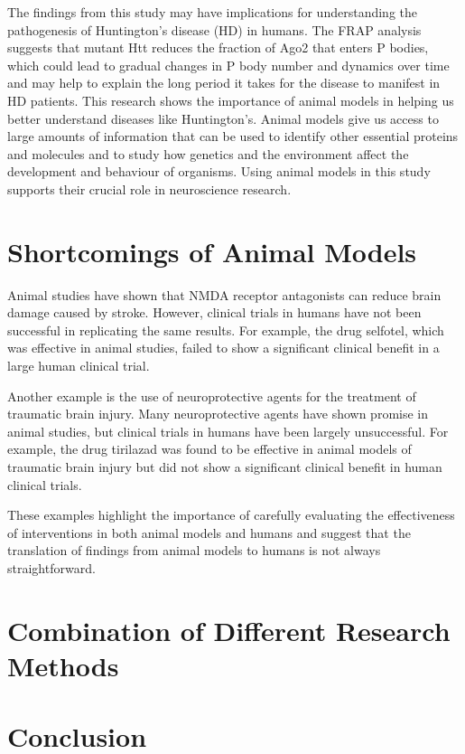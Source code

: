 \documentclass[10pt]{article}
\begin{document}
\begin{sloppypar}
  The findings from this study may have implications for understanding the pathogenesis of Huntington’s disease (HD) in humans. The FRAP analysis suggests that mutant Htt reduces the fraction of Ago2 that enters P bodies, which could lead to gradual changes in P body number and dynamics over time and may help to explain the long period it takes for the disease to manifest in HD patients. This research shows the importance of animal models in helping us better understand diseases like Huntington’s. Animal models give us access to large amounts of information that can be used to identify other essential proteins and molecules and to study how genetics and the environment affect the development and behaviour of organisms. Using animal models in this study supports their crucial role in neuroscience research.

  \section{Shortcomings of Animal Models}
  \label{sec:shortcomings}

  Animal studies have shown that NMDA receptor antagonists can reduce brain damage caused by stroke. However, clinical trials in humans have not been successful in replicating the same results. For example, the drug selfotel, which was effective in animal studies, failed to show a significant clinical benefit in a large human clinical trial.

  Another example is the use of neuroprotective agents for the treatment of traumatic brain injury. Many neuroprotective agents have shown promise in animal studies, but clinical trials in humans have been largely unsuccessful. For example, the drug tirilazad was found to be effective in animal models of traumatic brain injury but did not show a significant clinical benefit in human clinical trials.

  These examples highlight the importance of carefully evaluating the effectiveness of interventions in both animal models and humans and suggest that the translation of findings from animal models to humans is not always straightforward.

  \section{Combination of Different Research Methods}
  \label{sec:discussion}

  \section{Conclusion}
  \label{sec:conclusion}

  \pagebreak
  \singlespacing
  
  

\end{sloppypar}
\end{document}
